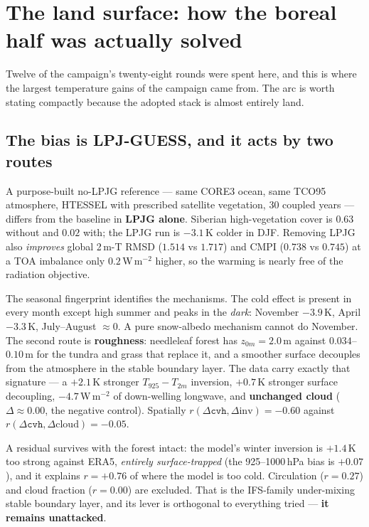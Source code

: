 \documentclass[10pt]{article}
\begin{document}
\section{The land surface: how the boreal half was actually solved}\label{sec:surface}

Twelve of the campaign's twenty-eight rounds were spent here, and this is where the largest
temperature gains of the campaign came from. The arc is worth stating compactly because the
adopted stack is almost entirely land.

\subsection{The bias is LPJ-GUESS, and it acts by two routes}
A purpose-built no-LPJG reference --- same CORE3 ocean, same TCO95 atmosphere, HTESSEL with
prescribed satellite vegetation, 30 coupled years --- differs from the baseline in
\textbf{LPJG alone}. Siberian high-vegetation cover is $0.63$ without and $\mathbf{0.02}$
with; the LPJG run is $\mathbf{-3.1}$\,K colder in DJF. Removing LPJG also \emph{improves}
global 2\,m-T RMSD ($1.514$ vs $1.717$) and CMPI ($0.738$ vs $0.745$) at a TOA imbalance
only $0.2$\,W\,m$^{-2}$ higher, so the warming is nearly free of the radiation objective.

The seasonal fingerprint identifies the mechanisms. The cold effect is present in every
month except high summer and peaks in the \emph{dark}: November $-3.9$\,K, April $-3.3$\,K,
July--August ${\approx}0$. A pure snow-albedo mechanism cannot do November. The second route
is \textbf{roughness}: needleleaf forest has $z_{0m}=2.0$\,m against $0.034$--$0.10$\,m for
the tundra and grass that replace it, and a smoother surface decouples from the atmosphere
in the stable boundary layer. The data carry exactly that signature --- a $+2.1$\,K stronger
$T_{925}-T_{2m}$ inversion, $+0.7$\,K stronger surface decoupling, $-4.7$\,W\,m$^{-2}$ of
down-welling longwave, and \textbf{unchanged cloud} ($\Delta\approx0.00$, the negative
control). Spatially $r(\Delta\mathtt{cvh},\Delta\mathrm{inv})=-0.60$ against
$r(\Delta\mathtt{cvh},\Delta\mathrm{cloud})=-0.05$.

A residual survives with the forest intact: the model's winter inversion is $+1.4$\,K too
strong against ERA5, \emph{entirely surface-trapped} (the 925--1000\,hPa bias is $+0.07$),
and it explains $r=+0.76$ of where the model is too cold. Circulation ($r=0.27$) and cloud
fraction ($r=0.00$) are excluded. That is the IFS-family under-mixing stable boundary layer,
and its lever is orthogonal to everything tried --- \textbf{it remains unattacked}.
\end{document}
